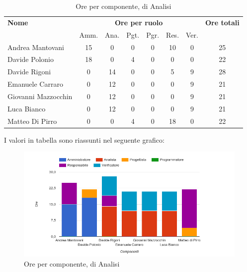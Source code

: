\begin{table}[H]
\begin{tabular}{lccccccc}
\toprule
    \textbf{Nome}  & \multicolumn{6}{c}{\textbf{Ore per ruolo}} & \textbf{Ore totali} \\
     & Amm. & Ana. & Pgt. & Pgr. & Res. & Ver. & \\
    \midrule
    
	   Andrea Mantovani & 15 & 0 & 0 & 0 & 10 & 0 & 25 \\
	     Davide Polonio & 18 & 0 & 4 & 0 & 0 & 0 & 22 \\
	      Davide Rigoni & 0 & 14 & 0 & 0 & 5 & 9 & 28 \\
	   Emanuele Carraro & 0 & 12 & 0 & 0 & 0 & 9 & 21 \\
	Giovanni Mazzocchin & 0 & 12 & 0 & 0 & 0 & 9 & 21 \\
	        Luca Bianco & 0 & 12 & 0 & 0 & 0 & 9 & 21 \\
	    Matteo Di Pirro & 0 & 0 & 4 & 0 & 18 & 0 & 22 \\
    
    \bottomrule
\end{tabular}
\caption{Ore per componente,  di Analisi}
\end{table}


I valori in tabella sono riassunti nel seguente grafico: \\ 

    \begin{figure}[H]
      \begin{center}
        \includegraphics[width=15cm]{res/img/suddivisioneRuoloProspettoOrario/orePerComponenteAnalisi.png}
      \caption{Ore per componente,  di Analisi}
      \end{center} 
    \end{figure}    
    
